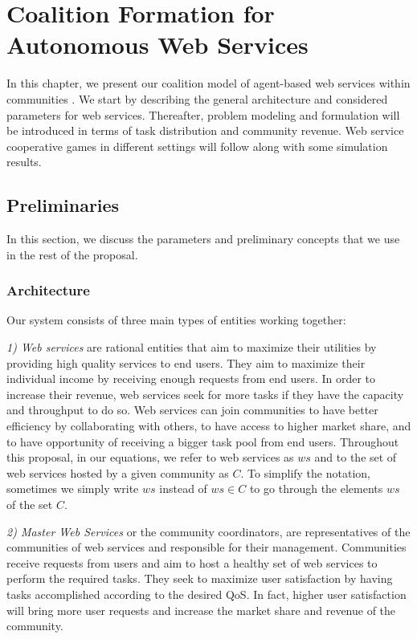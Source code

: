 \setcounter{chapter}{2}


\chapter{Coalition Formation for Autonomous Web Services}\label{sec:coalitionformationws}

In this chapter, we present our coalition model of agent-based web
services within communities \cite{SCC2013efficient}. We start by describing the general
architecture and considered parameters for web services.
Thereafter, problem modeling and formulation will be introduced in
terms of task distribution and community revenue. Web service
cooperative games in different settings will follow along with
some simulation results.

\section{Preliminaries}\label{s:preliminaries}

In this section, we discuss the parameters and preliminary
concepts that we use in the rest of the proposal.

\subsection{Architecture}

Our system consists of three main types of entities working
together:

\emph{1) Web services} are rational entities that aim to maximize
their utilities by providing high quality services to end users.
They aim to maximize their individual income by receiving enough
requests from end users. In order to increase their revenue, web
services seek for more tasks if they have the capacity and
throughput to do so. Web services can join communities to have
better efficiency by collaborating with others, to have access to
higher market share, and to have opportunity of receiving a bigger
task pool from end users. Throughout this proposal, in our
equations, we refer to web services as $ws$ and to the set of web
services hosted by a given community as $C$. To simplify the
notation, sometimes we simply write $ws$ instead of $ws \in C$ to
go through the elements $ws$ of the set $C$.

\emph{2) Master Web Services} or the community coordinators, are representatives of the
communities of web services and responsible for their management.
Communities receive requests from users and aim to host a healthy
set of web services to perform the required tasks. They seek to
maximize user satisfaction by having tasks accomplished according
to the desired QoS. In fact, higher user satisfaction will bring
more user requests and increase the market share and revenue of
the community.

